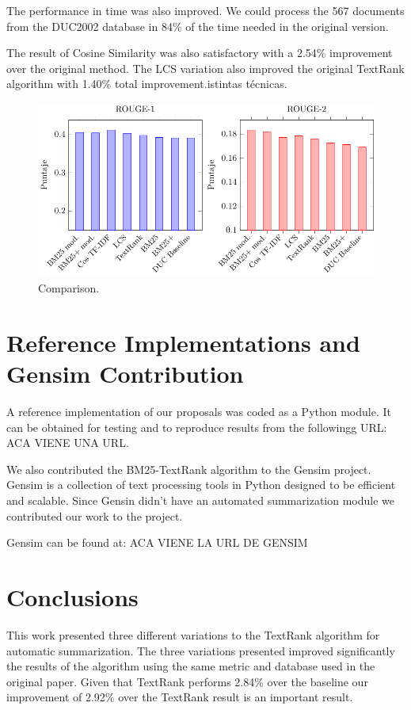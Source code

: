 \documentclass{llncs}
\begin{document}
The performance in time was also improved. We could process the 567 documents from the DUC2002 database in 84\% of the time needed in the original version.

The result of Cosine Similarity was also satisfactory with a 2.54\% improvement over the original method. The LCS variation also improved the original TextRank algorithm with 1.40\% total improvement.istintas técnicas.

\begin{figure}[h!]
    \centering
    \includegraphics[width=1\textwidth]{rouge-scores.pdf}
    \caption{Comparison.}
\end{figure}

\section{Reference Implementations and Gensim Contribution}
A reference implementation of our proposals was coded as a Python module. It can be obtained for testing and to reproduce results from the followingg URL: ACA VIENE UNA URL.

We also contributed the BM25-TextRank algorithm to the Gensim project. Gensim is a collection of text processing tools in Python designed to be efficient and scalable. Since Gensin didn't have an automated summarization module we contributed our work to the project. 

Gensim can be found at: ACA VIENE LA URL DE GENSIM

\section{Conclusions}
This work presented three different variations to the TextRank algorithm for automatic summarization. The three variations presented improved significantly the results of the algorithm using the same metric and database used in the original paper. Given that TextRank performs 2.84\% over the baseline our improvement of 2.92\% over the TextRank result is an important result. 
\end{document}
